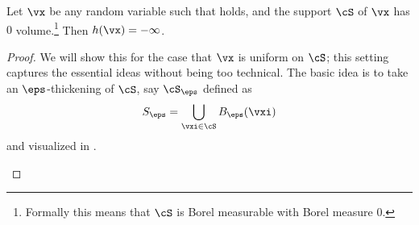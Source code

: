 \documentclass[../../book-main.tex]{subfiles}
\begin{document}
\begin{theorem}\label{thm:degenerate_entropy_negative_infinity}
    Let \(\vx\) be any random variable such that  holds, and the support \(\cS\) of \(\vx\) has \(0\) volume.\footnote{Formally this means that \(\cS\) is Borel measurable with Borel measure \(0\).} Then \(h(\vx) = -\infty\).
\end{theorem}
\begin{proof}
    We will show this for the case that \(\vx\) is uniform on \(\cS\); this setting captures the essential ideas without being too technical. The basic idea is to take an \(\eps\)-thickening of \(\cS\), say \(\cS_{\eps}\) defined as 
    \begin{equation}
        S_{\eps} = \bigcup_{\vxi \in \cS}B_{\eps}(\vxi)
    \end{equation}
    and visualized in .
    \begin{figure}[th]
        \centering
\end{figure}
\end{proof}
\end{document}
